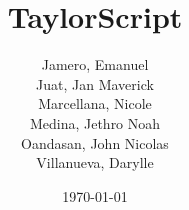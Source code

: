 

\title{
  \Huge{\textbf{TaylorScript}}
}
\author{
Jamero, Emanuel\\
Juat, Jan Maverick\\
Marcellana, Nicole\\
Medina, Jethro Noah\\
Oandasan, John Nicolas\\
Villanueva, Darylle\\
}
\date{\today}


\gappto{\UrlBreaks}{\UrlOrds}

\hypersetup {
  colorlinks,
  citecolor=red,
  filecolor=black,
  linkcolor=black,
  urlcolor=blue
}

\newcommand{\incfig}[2][1]{%
    \def\svgwidth{#1\columnwidth}
    {#2.pdf_tex}
}



\newtheorem{theorem}{Theorem}[section]
\newtheorem{corollary}{Corollary}[theorem]
\newtheorem{lemma}[theorem]{Lemma}

